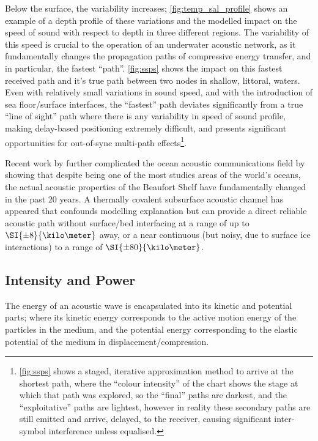Below the surface, the variability increases; \autoref{fig:temp_sal_profile} shows an example of a depth profile of these variations and the modelled impact on the speed of sound with respect to depth in three different regions. 
The variability of this speed is crucial to the operation of an underwater acoustic network, as it fundamentally changes the propagation paths of compressive energy transfer, and in particular, the fastest ``path''. 
\autoref{fig:ssps} shows the impact on this fastest received path and it's true path between two nodes in shallow, littoral, waters.
Even with relatively small variations in sound speed, and with the introduction of sea floor/surface interfaces, the ``fastest'' path deviates significantly from a true ``line of sight'' path where there is any variability in speed of sound profile, making delay-based positioning extremely difficult, and presents significant opportunities for out-of-sync multi-path effects\footnote{\autoref{fig:ssps} shows a staged, iterative approximation method to arrive at the shortest path, where the ``colour intensity'' of the chart shows the stage at which that path was explored, so the ``final'' paths are darkest, and the ``exploitative'' paths are lightest, however in reality these secondary paths are still emitted and arrive, delayed, to the receiver, causing significant inter-symbol interference unless equalised.}.

Recent work by \citet{Schmidt2016} further complicated the ocean acoustic communications field by showing that despite being one of the most studies areas of the world's oceans, the actual acoustic properties of the Beaufort Shelf have fundamentally changed in the past 20 years.
A thermally covalent subsurface acoustic channel has appeared that confounds modelling explanation but can provide a direct reliable acoustic path without surface/bed interfacing at a range of up to $\SI{\pm8}{\kilo\meter}$ away, or a near continuous (but noisy, due to surface ice interactions) to a range of $\SI{\pm80}{\kilo\meter}$.

\subsection{Intensity and Power}\label{sec:intensity-and-power}

The energy of an acoustic wave is encapsulated into its kinetic and potential parts; where its kinetic energy corresponds to the active motion energy of the particles in the medium, and the potential energy corresponding to the elastic potential of the medium in displacement/compression.

